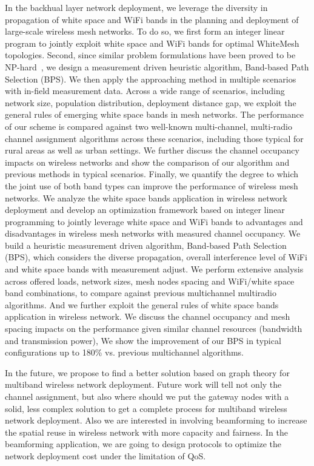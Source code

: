 In the backhual layer network deployment, we leverage the diversity 
in propagation of white space and WiFi bands in the planning and deployment
of large-scale wireless mesh networks. To do so, we first form an 
integer linear program to jointly exploit white space and WiFi bands 
for optimal WhiteMesh topologies. Second, since similar problem 
formulations have been proved to be NP-hard~\cite{jain2005impact}, 
we design a measurement driven heuristic algorithm, Band-based Path 
Selection (BPS). We then apply the approaching method in multiple 
scenarios with in-field measurement data. Across a wide range of 
scenarios, including network size, population distribution, deployment 
distance gap, we exploit the general rules of emerging white space 
bands in mesh networks. The performance of our scheme is compared 
against two well-known multi-channel, multi-radio channel assignment 
algorithms across these scenarios, including those typical for rural 
areas as well as urban settings. We further discuss the channel occupancy 
impacts on wireless networks and show the comparison of our algorithm 
and previous methods in typical scenarios. Finally, we quantify the degree 
to which the joint use of both band types can improve the performance of 
wireless mesh networks. We analyze the white space bands application in 
wireless network deployment and develop an optimization framework based 
on integer linear programming to jointly leverage white space and WiFi 
bands to advantages and disadvantages in wireless mesh networks with measured
channel occupancy. We build a heuristic measurement driven algorithm, 
Band-based Path Selection (BPS), which considers the diverse propagation, 
overall interference level of WiFi and white space bands with measurement 
adjust. We perform extensive analysis across offered loads, network sizes, 
mesh nodes spacing and WiFi/white space band combinations, to compare 
against previous multichannel multiradio algorithms. And we further 
exploit the general rules of white space bands application in wireless 
network. We discuss the channel occupancy and mesh spacing impacts on the 
performance given similar channel resources (bandwidth and transmission 
power), We show the improvement of our BPS in typical configurations up to 
180\% vs. previous multichannel algorithms.



In the future, we propose to find a better solution based on graph
theory for multiband wireless network deployment. Future work will
tell not only the channel assignment, but also where should we put
the gateway nodes with a solid, less complex solution to get a 
complete process for multiband wireless network deployment. Also 
we are interested in involving beamforming to increase the spatial
reuse in wireless network with more capacity and fairness. 
In the beamforming application, we are going to design protocols to 
optimize the network deployment cost under the limitation of QoS.

